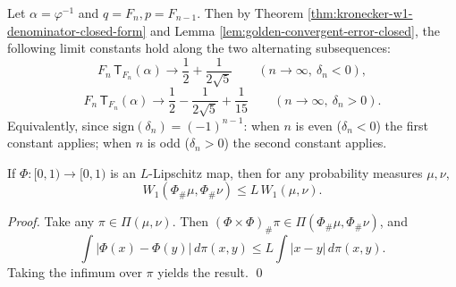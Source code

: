 \begin{corollary}\label{cor:kronecker-w1-fibonacci-limits}
Let \(\alpha=\varphi^{-1}\) and \(q=F_n,p=F_{n-1}\).
Then by Theorem \ref{thm:kronecker-w1-denominator-closed-form} and Lemma \ref{lem:golden-convergent-error-closed}, the following limit constants hold along the two alternating subsequences:
\[
F_n\,\mathsf{T}_{F_n}(\alpha)\longrightarrow
\frac12+\frac1{2\sqrt5}
\qquad(n\to\infty,\ \delta_n<0),
\]
\[
F_n\,\mathsf{T}_{F_n}(\alpha)\longrightarrow
\frac12-\frac1{2\sqrt5}+\frac1{15}
\qquad(n\to\infty,\ \delta_n>0).
\]
Equivalently, since \(\mathrm{sign}(\delta_n)=(-1)^{n-1}\): when \(n\) is even (\(\delta_n<0\)) the first constant applies; when \(n\) is odd (\(\delta_n>0\)) the second constant applies.
\end{corollary}

\begin{proposition}\label{prop:w1-lipschitz-pushforward}
If \(\Phi:[0,1)\to[0,1)\) is an \(L\)-Lipschitz map, then for any probability measures \(\mu,\nu\),
\[
W_1(\Phi_\#\mu,\Phi_\#\nu)\le L\,W_1(\mu,\nu).
\]
\end{proposition}
\begin{proof}
Take any \(\pi\in\Pi(\mu,\nu)\). Then \((\Phi\times\Phi)_\#\pi\in\Pi(\Phi_\#\mu,\Phi_\#\nu)\), and
\[
\int|\Phi(x)-\Phi(y)|\,d\pi(x,y)\le L\int|x-y|\,d\pi(x,y).
\]
Taking the infimum over \(\pi\) yields the result. \qed
\end{proof}

